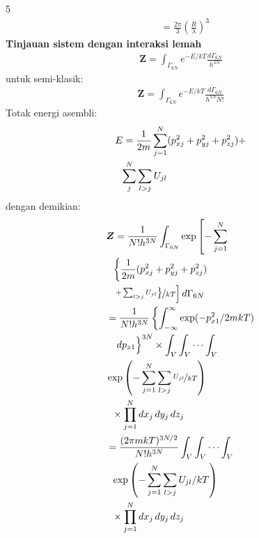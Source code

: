 \documentclass[a4paper  , 6 pt]{article}
\begin{document}
\begin{tiny}
\begin{multicols} {5}
\begin{align}
& = \frac{2 \pi }{3} \left( \frac{R}{\lambda}\right)^3
 \end{align}
 \textbf{Tinjauan sistem dengan interaksi lemah}\\
 \begin{align}
 \boldsymbol{Z} = \int_{\Gamma_{6N}} e^{- E/kT} \frac{d \Gamma_{6N}}{h^{3N}}
 \end{align}
 untuk semi-klasik:
 \begin{align}
 \boldsymbol{Z} = \int_{\Gamma_{6N}} e^{- E/kT} \frac{d \Gamma_{6N}}{h^{3N} N! }
 \end{align}
 Totak energi asembli:
 \begin{align}
&  E = \frac{1}{2m }\sum_{j = 1}^N (p_{xj }^2 + p_{yj}^2 + p_{zj}^2 ) + \nonumber \\
& \hspace{0.2 cm} \sum_j^N \sum_{l > j} U_{jl}
 \end{align}
 dengan demikian:
\begin{align}
 & \boldsymbol{Z} = \frac{1}{N! h^{3N}} \int_{\Gamma_{6N}} \exp \left[  - \sum_{j = 1}^N   \right .  \nonumber \\
  & \hspace{0.2 cm } \left\{ \frac{1}{2m} (p_{xj}^2 + p_{yj}^2 + p_{zj}^2)  \right . \nonumber 
  \\
  &\left.  \nicefrac{ \left.  \hspace{0.2 cm} + \sum_{l > j } U_{jl} \right \}  }{kT} \right ] d \Gamma_{6N} \nonumber \\
  &  =\frac{1}{N ! h^{3N }} \left\{ \int_{ - \infty}^{\infty} \exp(- p_{x1}^2 /2mkT) \right.  \nonumber \\
  & \hspace{0.2 cm} \left. \frac{}{} d p_{x1}  \right \}^{3N} \times \int_V \int_V \cdots \int_V  \nonumber \\
  & \exp \left( - \sum_{j = 1}^N \sum_{l > j} \nicefrac{U_{jl}}{kT} \right) \nonumber \\
  & \hspace{0.2 cm } \times \prod_{j = 1}^N  dx_j \, dy_j \, dz_j  \nonumber \\
  & = \frac{(2 \pi m kT )^{3 N/ 2}}{N ! h^{3N} } \int_V \int_V \cdots \int_V \nonumber \\
  & \hspace{0.2 cm} \exp \left (  - \sum_{j = 1}^N \sum_{l> j} U_{jl} /kT  \right ) \nonumber \\
  & \hspace{0.2 cm} \times \prod_{j = 1}^N dx_j \, dy_j \, d z_j \nonumber \\

\end{align}
\end{multicols}
\end{tiny}
\end{document}
